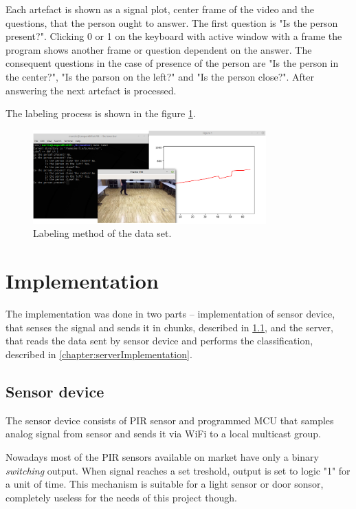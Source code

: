 Each artefact is shown as a signal plot, center frame of the video and the questions,
that the person ought to answer. The first question is "Is the person present?".
Clicking 0 or 1 on the keyboard with active window with a frame the program shows
another frame or question dependent on the answer. The consequent questions 
in the case of presence of the person are "Is the person in the center?", "Is the
parson on the left?" and "Is the person close?". After answering the next artefact
is processed.

The labeling process is shown in the figure \ref{fig:labeling}.

\begin{figure}[h!]
\begin{center}
\includegraphics[width=0.8\textwidth]{img/labeling2.png}
\caption{Labeling method of the data set.\label{fig:labeling}}
\end{center}
\end{figure}




\chapter{Implementation}

The implementation was done in two parts -- implementation of sensor device, that senses
the signal and sends it in chunks, described in \ref{chapter:sensorHW}, and the server,
that reads the data sent by sensor device and performs the classification, described in
\ref{chapter:serverImplementation}.

\section{Sensor device}
\label{chapter:sensorHW}

The sensor device consists of PIR sensor and programmed MCU that samples analog signal from
sensor and sends it via WiFi to a local multicast group.

Nowadays most of the PIR sensors available on market have only a binary {\it switching} output.
When signal reaches a set treshold, output is set to logic "1" for a unit of time.
This mechanism is suitable for a light sensor or door sonsor, completely useless
for the needs of this project though.

